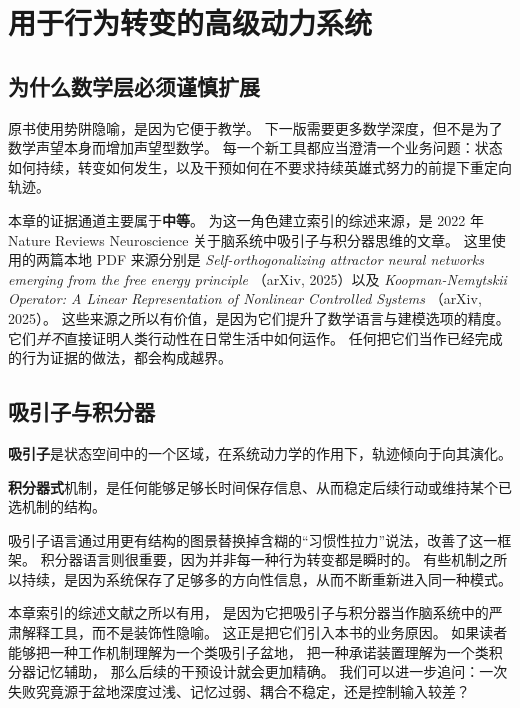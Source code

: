 \chapter{用于行为转变的高级动力系统}
\label{ch:advanced-dynamics}

\section{为什么数学层必须谨慎扩展}

原书使用势阱隐喻，是因为它便于教学。
下一版需要更多数学深度，但不是为了数学声望本身而增加声望型数学。
每一个新工具都应当澄清一个业务问题：状态如何持续，转变如何发生，以及干预如何在不要求持续英雄式努力的前提下重定向轨迹。

本章的证据通道主要属于\textbf{中等}。
为这一角色建立索引的综述来源，是 2022 年 Nature Reviews Neuroscience 关于脑系统中吸引子与积分器思维的文章。
这里使用的两篇本地 PDF 来源分别是
\emph{Self-orthogonalizing attractor neural networks emerging from the free energy principle}
（arXiv, 2025）以及
\emph{Koopman-Nemytskii Operator: A Linear Representation of Nonlinear Controlled Systems}
（arXiv, 2025）。
这些来源之所以有价值，是因为它们提升了数学语言与建模选项的精度。
它们\emph{并不}直接证明人类行动性在日常生活中如何运作。
任何把它们当作已经完成的行为证据的做法，都会构成越界。

\section{吸引子与积分器}

\begin{definition}[吸引子]
\textbf{吸引子}是状态空间中的一个区域，在系统动力学的作用下，轨迹倾向于向其演化。
\end{definition}

\begin{definition}[积分器式记忆]
\textbf{积分器式}机制，是任何能够足够长时间保存信息、从而稳定后续行动或维持某个已选机制的结构。
\end{definition}

\begin{discussion}
吸引子语言通过用更有结构的图景替换掉含糊的“习惯性拉力”说法，改善了这一框架。
积分器语言则很重要，因为并非每一种行为转变都是瞬时的。
有些机制之所以持续，是因为系统保存了足够多的方向性信息，从而不断重新进入同一种模式。
\end{discussion}

本章索引的综述文献之所以有用，
是因为它把吸引子与积分器当作脑系统中的严肃解释工具，而不是装饰性隐喻。
这正是把它们引入本书的业务原因。
如果读者能够把一种工作机制理解为一个类吸引子盆地，
把一种承诺装置理解为一个类积分器记忆辅助，
那么后续的干预设计就会更加精确。
我们可以进一步追问：一次失败究竟源于盆地深度过浅、记忆过弱、耦合不稳定，还是控制输入较差？

